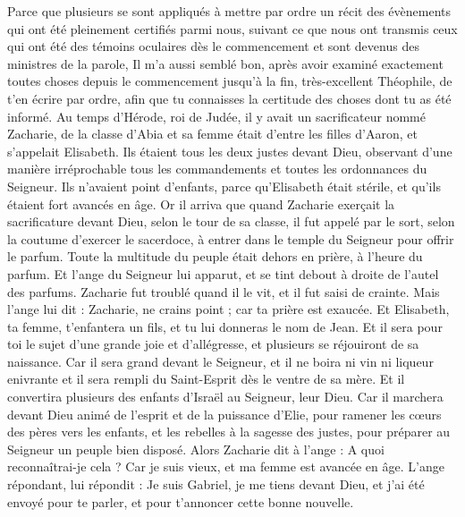 \begin{multicols}{2}
\VerseOne{}Parce que plusieurs se sont appliqués à mettre par ordre un récit des évènements qui ont été pleinement certifiés parmi nous,
suivant ce que nous ont transmis ceux qui ont été des témoins oculaires dès le commencement et sont devenus des ministres de la parole,
Il m’a aussi semblé bon, après avoir examiné exactement toutes choses depuis le commencement jusqu'à la fin, très-excellent Théophile, de t’en écrire par ordre,
afin que tu connaisses la certitude des choses dont tu as été informé.
Au temps d'Hérode, roi de Judée, il y avait un sacrificateur nommé Zacharie, de la classe d'Abia et sa femme était d’entre les filles d'Aaron, et s’appelait Elisabeth.
Ils étaient tous les deux justes devant Dieu, observant d’une manière irréprochable tous les commandements et toutes les ordonnances du Seigneur.
Ils n'avaient point d'enfants, parce qu'Elisabeth était stérile, et qu'ils étaient fort avancés en âge.
Or il arriva que quand Zacharie exerçait la sacrificature devant Dieu, selon le tour de sa classe, il fut appelé par le sort,
selon la coutume d'exercer le sacerdoce, à entrer dans le temple du Seigneur pour offrir le parfum.
Toute la multitude du peuple était dehors en prière, à l'heure du parfum.
Et l'ange du Seigneur lui apparut, et se tint debout à droite de l'autel des parfums.
Zacharie fut troublé quand il le vit, et il fut saisi de crainte.
Mais l'ange lui dit : Zacharie, ne crains point ; car ta prière est exaucée. Et Elisabeth, ta femme, t’enfantera un fils, et tu lui donneras le nom de Jean.
Et il sera pour toi le sujet d’une grande joie et d'allégresse, et plusieurs se réjouiront de sa naissance.
Car il sera grand devant le Seigneur, et il ne boira ni vin ni liqueur enivrante et il sera rempli du Saint-Esprit dès le ventre de sa mère.
Et il convertira plusieurs des enfants d'Israël au Seigneur, leur Dieu.
Car il marchera devant Dieu animé de l'esprit et de la puissance d'Elie, pour ramener les cœurs des pères vers les enfants, et les rebelles à la sagesse des justes, pour préparer au Seigneur un peuple bien disposé.
Alors Zacharie dit à l'ange : A quoi reconnaîtrai-je cela ? Car je suis vieux, et ma femme est avancée en âge.
L'ange répondant, lui répondit : Je suis Gabriel, je me tiens devant Dieu, et j’ai été envoyé pour te parler, et pour t'annoncer cette bonne nouvelle.

\end{multicols}
